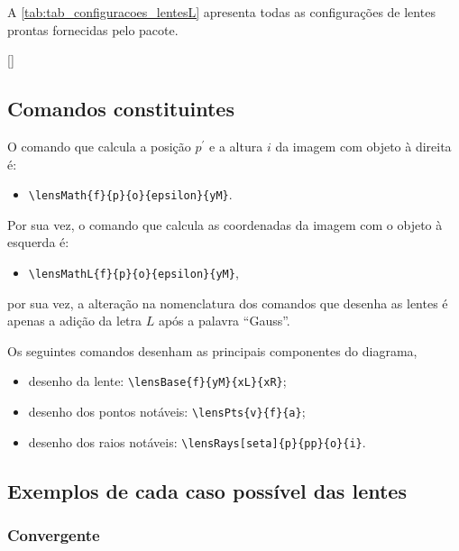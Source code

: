 \documentclass[a4paper,10pt]{article}
\begin{document}
A \autoref{tab:tab_configuracoes_lentesL} apresenta todas as configurações de lentes prontas fornecidas pelo pacote.

\begin{table}[ht]
  \centering
  [\linewidth]{
    
  }
\end{table}

\subsection{Comandos constituintes}

O comando que calcula a posição $p^{\prime}$ e a altura $i$ da imagem com objeto à direita é:
\begin{itemize}
  \item \verb|\lensMath{f}{p}{o}{epsilon}{yM}|.
\end{itemize}

Por sua vez, o comando que calcula as coordenadas da imagem com o objeto à esquerda é:
\begin{itemize}
  \item \verb|\lensMathL{f}{p}{o}{epsilon}{yM}|,
\end{itemize}
por sua vez, a alteração na nomenclatura dos comandos que desenha as lentes é apenas a adição da letra $L$ após a palavra \enquote{Gauss}.

Os seguintes comandos desenham as principais componentes do diagrama,
\begin{itemize}
  \item desenho da lente: \verb|\lensBase{f}{yM}{xL}{xR}|;
  \item desenho dos pontos notáveis: \verb|\lensPts{v}{f}{a}|;
  \item desenho dos raios notáveis: \verb|\lensRays[seta]{p}{pp}{o}{i}|.
\end{itemize}

\subsection{Exemplos de cada caso possível das lentes}

\subsubsection{Convergente}
\end{document}
